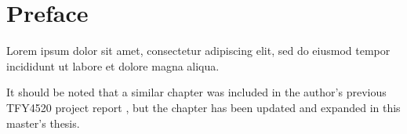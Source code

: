 \chapter*{Preface}
\label{ch:Preface}

Lorem ipsum dolor sit amet, consectetur adipiscing elit, sed do eiusmod tempor incididunt ut labore et dolore magna aliqua.


It should be noted that a similar chapter was included in the author's previous TFY4520 project report \cite{project_report}, but the chapter has been updated and expanded in this master's thesis.